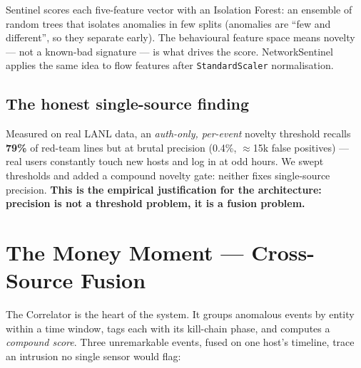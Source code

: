 \documentclass[11pt,a4paper]{article}
\newcommand{\pill}[2]{\tikz[baseline=-0.55ex]\node[fill=#1,text=white,rounded corners=3pt,inner sep=2pt,font=\scriptsize\bfseries]{#2};}
\begin{document}
Sentinel scores each five-feature vector with an Isolation Forest: an ensemble of random trees
that isolates anomalies in few splits (anomalies are ``few and different'', so they separate
early). The behavioural feature space means novelty — not a known-bad signature — is what
drives the score. NetworkSentinel applies the same idea to flow features after
\texttt{StandardScaler} normalisation.

\subsection{The honest single-source finding}

\begin{warnbox}
Measured on real LANL data, an \emph{auth-only, per-event} novelty threshold recalls
\textbf{79\%} of red-team lines but at brutal precision (0.4\%, $\approx$15k false positives) —
real users constantly touch new hosts and log in at odd hours. We swept thresholds and added a
compound novelty gate: neither fixes single-source precision. \textbf{This is the empirical
justification for the architecture: precision is not a threshold problem, it is a fusion
problem.}
\end{warnbox}

\section{The Money Moment — Cross-Source Fusion}

The Correlator is the heart of the system. It groups anomalous events by entity within a time
window, tags each with its kill-chain phase, and computes a \emph{compound score}. Three
unremarkable events, fused on one host's timeline, trace an intrusion no single sensor would
flag:

\begin{center}
\end{center}
\end{document}
